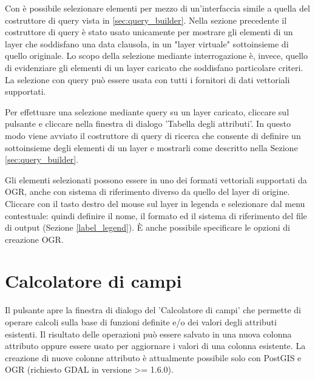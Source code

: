 \label{sec:select_by_query}

Con \qg è possibile selezionare elementi per mezzo di un'interfaccia simile a
quella del costruttore di query vista in \ref{sec:query_builder}.
Nella sezione precedente il costruttore di query è stato usato unicamente per
mostrare gli elementi di un layer che soddisfano una data clausola, in un
"layer virtuale" sottoinsieme di quello originale. Lo scopo della selezione
mediante interrogazione è, invece, quello di evidenziare gli elementi di un
layer caricato che soddisfano particolare criteri.
La selezione con query può essere usata con tutti i fornitori di dati
vettoriali supportati.

Per effettuare una selezione mediante query su un layer caricato,
cliccare sul pulsante 
e cliccare  nella finestra di dialogo 'Tabella degli attributi'.
In questo modo viene avviato il costruttore di query di ricerca che
consente di definire un sottoinsieme degli elementi di un layer e mostrarli come descritto
nella Sezione \ref{sec:query_builder}.


Gli elementi selezionati possono essere in uno dei formati vettoriali supportati da OGR, 
anche con sistema di riferimento diverso da quello del layer di origine.
Cliccare con il tasto destro del mouse sul layer in legenda e selezionare 
 dal menu contestuale: quindi definire il
nome, il formato ed il sistema di riferimento del file di output (Sezione \ref{label_legend}). 
È anche possibile specificare le opzioni di creazione OGR.

\section{Calcolatore di campi}\label{sec:field_calculator}

Il pulsante  
apre la finestra di dialogo del 'Calcolatore di campi' che permette di operare
calcoli sulla base di funzioni definite e/o dei valori degli attributi esistenti.
Il risultato delle operazioni può essere salvato in una nuova colonna attributo 
oppure essere usato per aggiornare i valori di una colonna esistente. 
La creazione di nuove colonne attributo è attualmente possibile solo con 
PostGIS e OGR (richiesto GDAL in versione >= 1.6.0).

